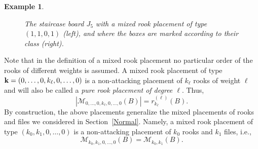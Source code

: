 \documentclass[10pt]{amsart}
\newtheorem{example}[theorem]{Example}%
\begin{document}
\begin{example}
\begin{figure}[h]
\caption{The staircase board $J_5$ with a mixed rook placement of type $(1,1,0,1)$ (left), and where the boxes are marked according to their class (right).}\label{FigMPL}
\end{figure} 
\end{example}
Note that in the definition of a mixed rook placement no particular order of the rooks of different weights is assumed. A mixed rook placement of type ${\bf k} = (0,\ldots,0,k_{\ell},0,\ldots,0)$ is a non-attacking placement of $k_{\ell}$ rooks of weight $\ell$ and will also be called a {\em pure rook placement of degree $\ell$}. Thus, 
\begin{equation}\label{RedVarv}
|{\mathcal M}_{0,\ldots,0,k_{\ell},0,\ldots,0}(B)|=r_{k_{\ell}}^{(\ell)}(B).
\end{equation}
By construction, the above placements generalize the mixed placements of rooks and files we considered in Section~\ref{Normal}. Namely, a mixed rook placement of type $(k_0,k_1,0,\ldots,0)$ is a non-attacking placement of $k_{0}$ rooks and $k_1$ files, i.e., 
\begin{equation}\label{RedOre}
{\mathcal M}_{k_0,k_1,0,\ldots,0}(B)={\mathcal M}_{k_0,k_1}(B).
\end{equation}
\end{document}

